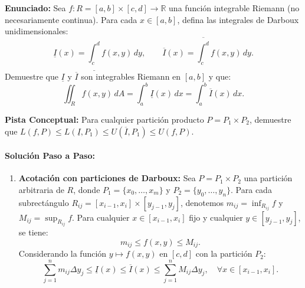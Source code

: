 \documentclass[11pt,a4paper]{article}
\begin{document}
\begin{tcolorbox}[colback=white,colframe=gray!40,arc=1mm,boxrule=0.5pt,left=3mm,right=3mm,top=2mm,bottom=2mm]
\textbf{Enunciado:} Sea $f: R = [a,b] \times [c,d] \to \mathbb{R}$ una función integrable Riemann (no necesariamente continua). Para cada $x \in [a,b]$, defina las integrales de Darboux unidimensionales:
\begin{equation*}
\underline{I}(x) = \underline{\int_c^d} f(x,y) \, dy, \qquad \overline{I}(x) = \overline{\int_c^d} f(x,y) \, dy.
\end{equation*}
Demuestre que $\underline{I}$ y $\overline{I}$ son integrables Riemann en $[a,b]$ y que:
\begin{equation*}
\iint_R f(x,y) \, dA = \int_a^b \underline{I}(x) \, dx = \int_a^b \overline{I}(x) \, dx.
\end{equation*}
\end{tcolorbox}

\begin{tcolorbox}[colback=yellow!4,colframe=accentamber!70,arc=1mm,boxrule=0.5pt,left=3mm,right=3mm,top=1.5mm,bottom=1.5mm]
\textbf{Pista Conceptual:} Para cualquier partición producto $P = P_1 \times P_2$, demuestre que $L(f, P) \le L(\underline{I}, P_1) \le U(\overline{I}, P_1) \le U(f, P)$.
\end{tcolorbox}

\paragraph{Solución Paso a Paso:}\par
\begin{enumerate}[label=\textbf{\arabic*.}]
\item \textbf{Acotación con particiones de Darboux:}
Sea $P = P_1 \times P_2$ una partición arbitraria de $R$, donde $P_1 = \{x_0, \dots, x_m\}$ y $P_2 = \{y_0, \dots, y_n\}$.
Para cada subrectángulo $R_{ij} = [x_{i-1}, x_i] \times [y_{j-1}, y_j]$, denotemos $m_{ij} = \inf_{R_{ij}} f$ y $M_{ij} = \sup_{R_{ij}} f$.
Para cualquier $x \in [x_{i-1}, x_i]$ fijo y cualquier $y \in [y_{j-1}, y_j]$, se tiene:
\begin{equation*}
m_{ij} \le f(x,y) \le M_{ij}.
\end{equation*}
Considerando la función $y \mapsto f(x,y)$ en $[c,d]$ con la partición $P_2$:
\begin{equation*}
\sum_{j=1}^n m_{ij} \Delta y_j \le \underline{I}(x) \le \overline{I}(x) \le \sum_{j=1}^n M_{ij} \Delta y_j, \quad \forall x \in [x_{i-1}, x_i].
\end{equation*}
\end{enumerate}
\end{document}
